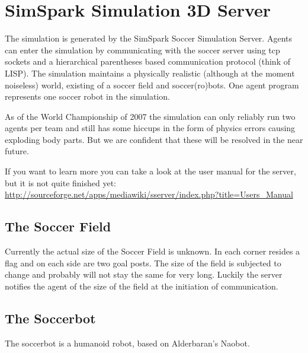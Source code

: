 \chapter{SimSpark Simulation 3D Server}
\label{chServer}

The simulation is generated by the SimSpark Soccer Simulation Server. Agents can enter
the simulation by communicating with the soccer server using tcp sockets and a
hierarchical parentheses based communication protocol (think of LISP). The simulation maintains a
physically realistic (although at the moment noiseless) world, existing of a
soccer field and soccer(ro)bots. One agent program represents one soccer robot in the
simulation.

As of the World Championship of 2007 the simulation can only reliably run two agents per
team and still has some hiccups in the form of physics errors causing exploding body parts.
But we are confident that these will be resolved in the near future.

If you want to learn more you can take a look at the user manual for the server, but it is not quite finished yet:\\
\url{http://sourceforge.net/apps/mediawiki/sserver/index.php?title=Users_Manual}

\section{The Soccer Field}

Currently the actual size of the Soccer Field is unknown. In each corner resides a flag and on each side are two goal
posts. The size of the field is subjected to change and probably will not stay the same for
very long. Luckily the server notifies the agent of the size of the field at the initiation of communication.

\section{The Soccerbot}

The soccerbot is a humanoid robot, based on Alderbaran's Naobot.



